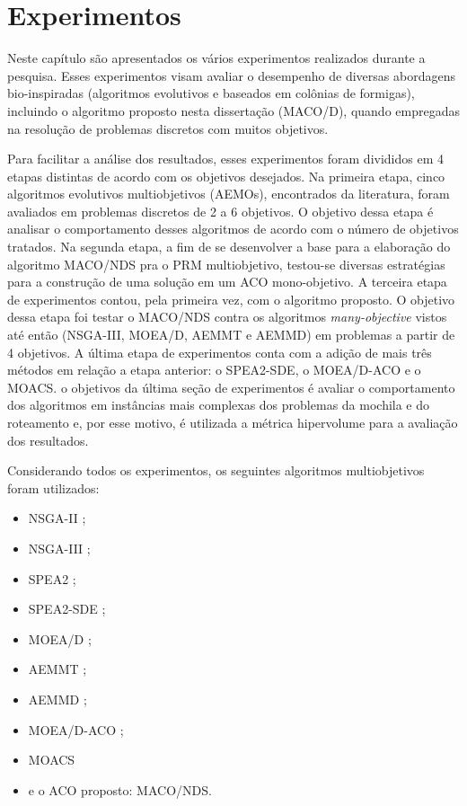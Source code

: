 \chapter[Experimentos]{Experimentos}
\label{chapter_experimentos}

Neste capítulo são apresentados os vários experimentos realizados durante a pesquisa. Esses experimentos visam avaliar o desempenho de diversas abordagens bio-inspiradas (algoritmos evolutivos e baseados em colônias de formigas), incluindo o algoritmo proposto nesta dissertação (MACO/D), quando empregadas na resolução de problemas discretos com muitos objetivos. 

Para facilitar a análise dos resultados, esses experimentos foram divididos em 4 etapas distintas de acordo com os objetivos desejados. Na primeira etapa, cinco algoritmos evolutivos multiobjetivos (AEMOs), encontrados da literatura, foram avaliados em problemas discretos de 2 a 6 objetivos. O objetivo dessa etapa é analisar o comportamento desses algoritmos de acordo com o número de objetivos tratados. Na segunda etapa, a fim de se desenvolver a base para a elaboração do algoritmo MACO/NDS pra o PRM multiobjetivo, testou-se diversas estratégias para a construção de uma solução em um ACO mono-objetivo. A terceira etapa de experimentos contou, pela primeira vez, com o algoritmo proposto. O objetivo dessa etapa foi testar o MACO/NDS contra os algoritmos \textit{many-objective} vistos até então (NSGA-III, MOEA/D, AEMMT e AEMMD) em problemas a partir de 4 objetivos. A última etapa de experimentos conta com a adição de mais três métodos em relação a etapa anterior: o SPEA2-SDE, o MOEA/D-ACO e o MOACS. o objetivos da última seção de experimentos é avaliar o comportamento dos algoritmos em instâncias mais complexas dos problemas da mochila e do roteamento e, por esse motivo, é utilizada a métrica hipervolume para a avaliação dos resultados.

Considerando todos os experimentos, os seguintes algoritmos multiobjetivos foram utilizados:

\acresetall
\begin{itemize}
	\item \ac{NSGA-II} \cite{Deb2002};
	\item \ac{NSGA-III} \cite{Deb2014};
	\item \ac{SPEA2} \cite{Zitzler2002};
	\item \ac{SPEA2-SDE} \cite{Spea2SDE};
	\item \ac{MOEA/D} \cite{Zhang2007};
	\item \ac{AEMMT} \cite{Brasil2013};
	\item \ac{AEMMD} \cite{Lafeta2016};
	\item \ac{MOEA/D-ACO} \cite{Ke2013};
	\item \ac{MOACS} \cite{Riveros2016}
	\item e o ACO proposto: \ac{MACO/NDS}.
\end{itemize}

